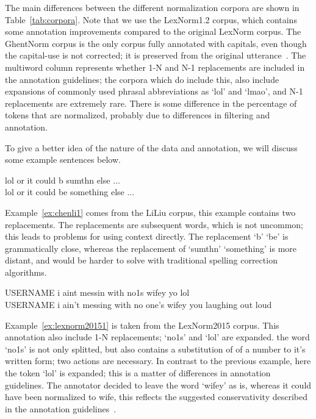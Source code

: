 \documentclass[a4paper,10pt,twoside]{article}
\begin{document}
The main differences between the different normalization corpora are shown in
Table~\ref{tab:corpora}.  Note that we use the LexNorm1.2 corpus, which contains
some annotation improvements compared to the original LexNorm corpus.
The GhentNorm corpus is the only corpus fully
annotated with capitals, even though the capital-use is not corrected; it is
preserved from the original utterance~\cite{DECLERCQ14}. The multiword
column represents whether 1-N and N-1 replacements are included in the
annotation guidelines; the corpora which do include this, also include
expansions of commonly used phrasal abbreviations as `lol' and `lmao', and N-1
replacements are extremely rare.  There is some difference in the percentage of
tokens that are normalized, probably due to differences in filtering and
annotation.

To give a better idea of the nature of the data and annotation, we will 
discuss some example sentences below.

\begin{exe}
    \ex \gll lol or it could b sumthn else ... \\
    lol or it could be something else ... \\
    \label{ex:chenli1}
\end{exe}

Example~\ref{ex:chenli1} comes from the LiLiu corpus, this example contains two
replacements. The replacements are subsequent words, which is not uncommon;
this leads to problems for using context directly. The replacement `b'
 `be' is grammatically close, whereas the replacement of `sumthn'
 `something' is more distant, and would be harder to solve with
traditional spelling correction algorithms.

\begin{exe}
    \ex \gll USERNAME i aint messin with no1s wifey yo lol \\
    USERNAME i ain't messing with {no one's} wifey you {laughing out loud} \\
    \label{ex:lexnorm20151}
\end{exe}

Example~\ref{ex:lexnorm20151} is taken from the LexNorm2015 corpus. This
annotation also include 1-N replacements; `no1s' and `lol' are expanded. the
word `no1s' is not only splitted, but also contains a substitution of of a
number to it's written form; two actions are necessary. In contrast to the
previous example, here the token `lol' is expanded; this is a matter of
differences in annotation guidelines.  The annotator decided to leave the word
`wifey' as is, whereas it could have been normalized to wife, this reflects the
suggested conservativity described in the annotation
guidelines~\cite{lexnorm2015guidelines}.
\end{document}
